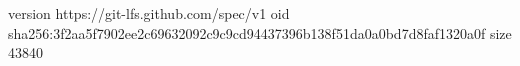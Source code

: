 version https://git-lfs.github.com/spec/v1
oid sha256:3f2aa5f7902ee2c69632092c9c9cd94437396b138f51da0a0bd7d8faf1320a0f
size 43840
